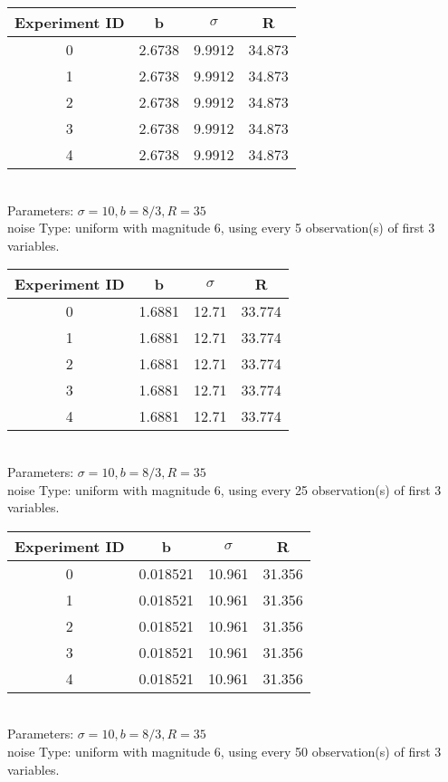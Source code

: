 \begin{multicols}{3}
\begin{tabular}{cccc}
\hline Experiment ID & b & $\sigma$ & R \\ \hline 
0 & 2.6738 & 9.9912 & 34.873\\ \hline 
 1 & 2.6738 & 9.9912 & 34.873\\ \hline 
 2 & 2.6738 & 9.9912 & 34.873\\ \hline 
 3 & 2.6738 & 9.9912 & 34.873\\ \hline 
 4 & 2.6738 & 9.9912 & 34.873\\ \hline 
 \end{tabular}\\
Parameters: $\sigma=10, b=8/3, R=35$\\
noise Type: uniform with magnitude 6, using every 5 observation(s) of first 3 variables.\\
\begin{tabular}{cccc}
\hline Experiment ID & b & $\sigma$ & R \\ \hline 
0 & 1.6881 & 12.71 & 33.774\\ \hline 
 1 & 1.6881 & 12.71 & 33.774\\ \hline 
 2 & 1.6881 & 12.71 & 33.774\\ \hline 
 3 & 1.6881 & 12.71 & 33.774\\ \hline 
 4 & 1.6881 & 12.71 & 33.774\\ \hline 
 \end{tabular}\\
Parameters: $\sigma=10, b=8/3, R=35$\\
noise Type: uniform with magnitude 6, using every 25 observation(s) of first 3 variables.\\
\begin{tabular}{cccc}
\hline Experiment ID & b & $\sigma$ & R \\ \hline 
0 & 0.018521 & 10.961 & 31.356\\ \hline 
 1 & 0.018521 & 10.961 & 31.356\\ \hline 
 2 & 0.018521 & 10.961 & 31.356\\ \hline 
 3 & 0.018521 & 10.961 & 31.356\\ \hline 
 4 & 0.018521 & 10.961 & 31.356\\ \hline 
 \end{tabular}\\
Parameters: $\sigma=10, b=8/3, R=35$\\
noise Type: uniform with magnitude 6, using every 50 observation(s) of first 3 variables.\\
\begin{tabular}{cccc}

\end{tabular}
\end{multicols}
